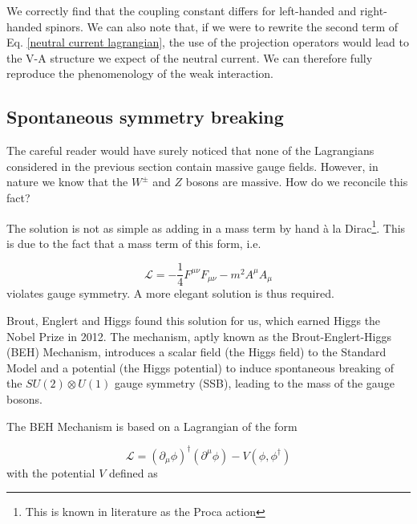 \documentclass[10pt,a4paper]{book}
\begin{document}
We correctly find that the coupling constant differs for left-handed and right-handed spinors. We can also note that, if we were to rewrite the second term of Eq. \ref{neutral current lagrangian}, the use of the projection operators would lead to the V-A structure we expect of the neutral current. We can therefore fully reproduce the phenomenology of the weak interaction.

\subsection{Spontaneous symmetry breaking}

\label{ssb}

The careful reader would have surely noticed that none of the Lagrangians considered in the previous section contain massive gauge fields. However, in nature we know that the $W^\pm$ and $Z$ bosons are massive. How do we reconcile this fact?

The solution is not as simple as adding in a mass term by hand \`{a} la Dirac\footnote{This is known in literature as the Proca action}. This is due to the fact that a mass term of this form, i.e.

\begin{equation}
    \mathcal{L} = -\frac{1}{4}F^{\mu\nu}F_{\mu\nu} - m^2A^\mu A_\mu
\end{equation}
violates gauge symmetry. A more elegant solution is thus required.

Brout, Englert and Higgs found this solution for us, which earned Higgs the Nobel Prize in 2012.
The mechanism, aptly known as the Brout-Englert-Higgs (BEH) Mechanism, introduces a scalar field (the Higgs field) to the Standard Model and a potential (the Higgs potential) to induce spontaneous breaking of the $SU(2)\otimes U(1)$ gauge symmetry (SSB), leading to the mass of the gauge bosons.


The BEH Mechanism is based on a Lagrangian of the form

\begin{equation}
    \mathcal{L} = (\partial_\mu\phi)^\dagger(\partial^\mu\phi) - V(\phi, \phi^\dagger)
    \label{higgs lagrangian}
\end{equation}
with the potential $V$ defined as
\end{document}
